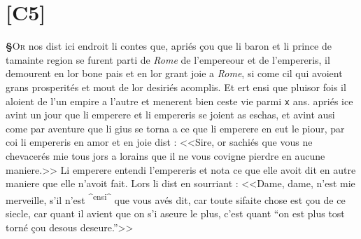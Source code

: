 \documentclass[12pt]{article} %
\newcommand{\placeName}[1]{\emph{#1}} %
\newcommand{\num}[1]{\texttt{#1}}    %
\newcommand{\add}[1]{\textsuperscript{#1}}       %
\newcommand{\supplied}[1]{\textlangle#1\textrangle} %
\newcounter{paranum}
\newcommand{\pnum}{\stepcounter{paranum}\textbf{§\arabic{paranum}}\quad}
\begin{document}
\section*{[C5]}


\pnum \lettrine[lines=4]{\color{darkred}O}{r} nos dist ici endroit li contes que, apriés çou que li baron et li prince de tamai\supplied{n}te region se furent parti de \placeName{Rome} de l'empereour et de l'empereris, il demourent en lor bone pais et en lor grant joie a \placeName{Rome}, si come cil qui avoient grans prosperités et mout de lor desiriés acomplis. Et ert ensi que pluisor fois il aloient de l'un empire a l'autre et menerent bien ceste vie parmi \num{x} ans. apriés ice avint un jour que li emperere et li empereris se joient as eschas, et avint ausi come par aventure que li gius se torna a ce que li emperere en eut le piour, par coi li empereris en amor et en joie dist : <<Sire, or sachiés que vous ne chevacerés mie tous jors a lorains que il ne vous covigne pierdre en aucune maniere.>> Li emperere entendi l'empereris et nota ce que elle avoit dit en autre maniere que elle n'avoit fait. Lors li dist en sourriant : <<Dame, dame, n'est mie merveille, s'il n'est \add{^ensi^} que vous avés dit, car toute sifaite chose est çou de ce siecle, car quant il avient que on s'i aseure le plus, c'est quant ``on est plus tost torné çou desous deseure.''>>
\end{document}
